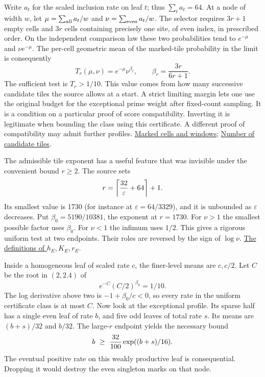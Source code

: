 Write \(a_t\) for the scaled inclusion rate on leaf \(t\); thus \(\sum_t a_t=64\). At a node of width \(w\), let \(\mu=\sum_{\rm all} a_t/w\) and \(\nu=\sum_{\rm even} a_t/w\). The selector requires \(3r+1\) empty cells and \(3r\) cells containing precisely one site, of even index, in prescribed order. On the independent comparison law these two probabilities tend to \(e^{-\mu}\) and \(\nu e^{-\mu}\). The per-cell geometric mean of the marked-tile probability in the limit is consequently
\[
 T_r(\mu,\nu)=e^{-\mu}\nu^{\beta_r},\qquad
 \beta_r=\frac{3r}{6r+1}.
\]
The sufficient test is \(T_r>1/10\). This value comes from how many successive candidate tiles the source allows at a start. A strict limiting margin lets one use the original budget for the exceptional prime weight after fixed-count sampling. It is a condition on a particular proof of score compatibility. Inverting it is legitimate when bounding the class using this certificate. A different proof of compatibility may admit further profiles.
\href{https://github.com/nousentllc/riemann-hypothesis/blob/40e56bab026552e089d7afcfeff08d2defb9c005/src/Formalism/SubspaceCounting/GoodOrbitIntervalTileCondition.lean#L12-L26}{Marked cells and windows};
\href{https://github.com/nousentllc/riemann-hypothesis/blob/40e56bab026552e089d7afcfeff08d2defb9c005/src/Formalism/SharpRestriction/GrowthBounds/UnramifiedQuadraticSetting.lean#L239-L251}{Number of candidate tiles}.

The admissible tile exponent has a useful feature that was invisible under the convenient bound \(r\ge2\). The source sets
\[
 r=\left\lceil{32\over\varepsilon}+64\right\rceil+1.
\]
Its smallest value is 1730 (for instance at \(\varepsilon=64/3329\)), and it is unbounded as \(\varepsilon\) decreases. Put \(\beta_0=5190/10381\), the exponent at \(r=1730\). For \(\nu>1\) the smallest possible factor uses \(\beta_0\). For \(\nu<1\) the infimum uses \(1/2\). This gives a rigorous uniform test at two endpoints. Their roles are reversed by the sign of \(\log\nu\).
\href{https://github.com/nousentllc/riemann-hypothesis/blob/40e56bab026552e089d7afcfeff08d2defb9c005/src/Development/AutomorphicArithmetic/ThickFrames/MarkedLow.lean#L23-L29}{The definitions of \(h_E,K_E,r_E\)}.

Inside a homogeneous leaf of scaled rate \(c\), the finer-level means are \(c,c/2\). Let \(C\) be the root in \((2,2.4)\) of
\begin{equation}
 e^{-C}(C/2)^{\beta_0}=1/10.
 \label{eq:fixed-rate-cap}
\end{equation}
The log derivative above two is \(-1+\beta_0/c<0\), so every rate in the uniform certificate class is at most \(C\). Now look at the exceptional profile. Its sparse half has a single even leaf of rate \(b\), and five odd leaves of total rate \(s\). Its means are \((b+s)/32\) and \(b/32\). The large-\(r\) endpoint yields the necessary bound
\begin{equation}
 b\ \ge\ {32\over100}\exp((b+s)/16).
 \label{eq:fixed-rate-tag}
\end{equation}
The eventual positive rate on this weakly productive leaf is consequential. Dropping it would destroy the even singleton marks on that node.

